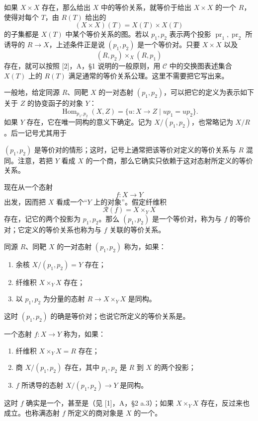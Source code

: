 如果 $X\times X$ 存在，那么给出 $X$ 中的等价关系，就等价于给出 $X\times X$ 的一个 $R$，使得对每个 $T$，由 $R(T)$ 给出的
\[
 (X\times X)(T)=X(T)\times X(T)
\]
的子集都是 $X(T)$ 中某个等价关系的图。若以 $p_1,p_2$ 表示两个投影 $\operatorname{pr}_1,\operatorname{pr}_2$ 所诱导的 $R\to X$，上述条件正是说 $(p_1,p_2)$ 是一个等价对。只要 $X\times X$ 以及
\[
 (R,p_2)\times_X(R,p_1)
\]
存在，就可以按照 [2]，A，\S1 说明的一般原则，用 $\mathcal C$ 中的交换图表述集合 $X(T)$ 上的 $R(T)$ 满足通常的等价关系公理。这里不需要把它写出来。

一般地，给定同源 $R$、同靶 $X$ 的一对态射 $(p_1,p_2)$，可以把它的定义为表示如下关于 $Z$ 的协变函子的对象 $Y$：
\[
 \operatorname{Hom}_{p_1,p_2}(X,Z)
 =\{u:X\to Z\mid up_1=up_2\}.
\]
如果 $Y$ 存在，它在唯一同构的意义下确定。记为 $X/(p_1,p_2)$，也常略记为 $X/R$。后一记号尤其用于

$(p_1,p_2)$ 是等价对的情形；这时，记号上通常把该等价对定义的等价关系与 $R$ 混同。注意，若把 $Y$ 看成 $X$ 的一个商，那么它确实只依赖于这对态射所定义的等价关系。

现在从一个态射
\[
 f:X\longrightarrow Y
\]
出发，因而把 $X$ 看成一个“$Y$ 上的对象”。假定纤维积
\[
 \mathcal R(f)=X\times_YX
\]
存在，记它的两个投影为 $p_1,p_2$。那么 $(p_1,p_2)$ 是一个等价对，称为与 $f$ 的等价对；它定义的等价关系也称为与 $f$ 关联的等价关系。

同源 $R$、同靶 $X$ 的一对态射 $(p_1,p_2)$ 称为，如果：
\begin{enumerate}[label=(\roman*)]
 \item 余核 $X/(p_1,p_2)=Y$ 存在；
 \item 纤维积 $X\times_YX$ 存在；
 \item 以 $p_1,p_2$ 为分量的态射 $R\to X\times_YX$ 是同构。
\end{enumerate}
这时 $(p_1,p_2)$ 的确是等价对；也说它所定义的等价关系是。

一个态射 $f:X\to Y$ 称为，如果：
\begin{enumerate}[label=(\roman*)]
 \item 纤维积 $X\times_YX=R$ 存在；
 \item 商 $X/(p_1,p_2)$ 存在，其中 $p_1,p_2$ 是 $R$ 到 $X$ 的两个投影；
 \item $f$ 所诱导的态射 $X/(p_1,p_2)\to Y$ 是同构。
\end{enumerate}
这时 $f$ 确实是一个，甚至是（见 [1]，A，\S2 a.3）；如果 $X\times_YX$ 存在，反过来也成立。也称满态射 $f$ 所定义的商对象是 $X$ 的一个。


